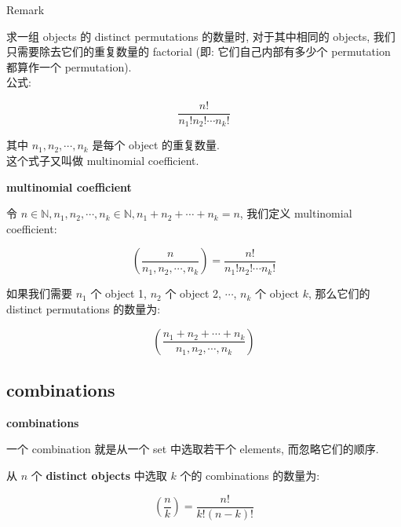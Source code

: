 \documentclass{qlnotes-export}
\begin{document}
\begin{qlremark}{Remark}

求一组 objects 的 distinct permutations 的数量时, 对于其中相同的 objects, 我们只需要除去它们的重复数量的 factorial (即: 它们自己内部有多少个 permutation 都算作一个 permutation).\\
公式:

\[\frac{n!}{n_{1}!n_{2}!\cdots n_{k}!}\]

其中 \(n_{1},n_{2},\cdots,n_{k}\) 是每个 object 的重复数量.\\
这个式子又叫做 multinomial coefficient.

\begin{definition}{\protect{}\label{kn-multinomial-coefficient}{\textbf{multinomial
coefficient}}}

令 \(n \in {\mathbb{N}},n_{1},n_{2},\cdots,n_{k} \in {\mathbb{N}},n_{1} + n_{2} + \cdots + n_{k} = n\), 我们定义 multinomial coefficient:

\[\left( \frac{n}{n_{1},n_{2},\cdots,n_{k}} \right) = \frac{n!}{n_{1}!n_{2}!\cdots n_{k}!}\]

\end{definition}

\begin{proposition}

如果我们需要 \(n_{1}\) 个 object 1, \(n_{2}\) 个 object 2, \(\cdots\), \(n_{k}\) 个 object \(k\), 那么它们的 distinct permutations 的数量为:

\[\left( \frac{n_{1} + n_{2} + \cdots + n_{k}}{n_{1},n_{2},\cdots,n_{k}} \right)\]

\end{proposition}

\end{qlremark}

\subsection{combinations}\label{combinations}

\begin{definition}{\protect{}\label{kn-combinations}{\textbf{combinations}}}

一个 combination 就是从一个 set 中选取若干个 elements, 而忽略它们的顺序.

\end{definition}

\begin{proposition}

从 \(n\) 个 \textbf{distinct objects} 中选取 \(k\) 个的 combinations 的数量为:

\[\left( \frac{n}{k} \right) = \frac{n!}{k!(n - k)!}\]

\end{proposition}
\end{document}
